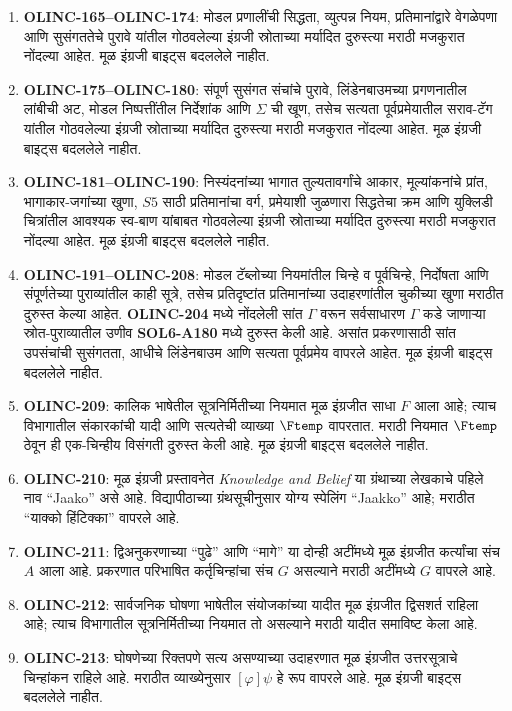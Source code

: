 \begin{enumerate}
\item \textbf{OLINC-165--OLINC-174}: मोडल प्रणालींची
सिद्धता, व्युत्पन्न नियम, प्रतिमानांद्वारे वेगळेपणा
आणि सुसंगततेचे पुरावे यांतील गोठवलेल्या इंग्रजी
स्रोताच्या मर्यादित दुरुस्त्या मराठी मजकुरात नोंदल्या
आहेत. मूळ इंग्रजी बाइट्स बदललेले नाहीत.

\item \textbf{OLINC-175--OLINC-180}: संपूर्ण सुसंगत संचांचे
पुरावे, लिंडेनबाउमच्या प्रगणनातील लांबीची अट,
मोडल निष्पत्तींतील निर्देशांक आणि \(\Sigma\) ची खूण,
तसेच सत्यता पूर्वप्रमेयातील सराव-टॅग यांतील
गोठवलेल्या इंग्रजी स्रोताच्या मर्यादित दुरुस्त्या
मराठी मजकुरात नोंदल्या आहेत. मूळ इंग्रजी बाइट्स
बदललेले नाहीत.

\item \textbf{OLINC-181--OLINC-190}: निस्यंदनांच्या
भागात तुल्यतावर्गांचे आकार, मूल्यांकनांचे प्रांत,
भागाकार-जगांच्या खुणा, \(S5\) साठी प्रतिमानांचा
वर्ग, प्रमेयाशी जुळणारा सिद्धतेचा क्रम आणि
युक्लिडी चित्रांतील आवश्यक स्व-बाण यांबाबत
गोठवलेल्या इंग्रजी स्रोताच्या मर्यादित दुरुस्त्या
मराठी मजकुरात नोंदल्या आहेत. मूळ इंग्रजी बाइट्स
बदललेले नाहीत.

\item \textbf{OLINC-191--OLINC-208}: मोडल टॅब्लोच्या
नियमांतील चिन्हे व पूर्वचिन्हे, निर्दोषता आणि
संपूर्णतेच्या पुराव्यांतील काही सूत्रे, तसेच
प्रतिदृष्टांत प्रतिमानांच्या उदाहरणांतील
चुकीच्या खुणा मराठीत दुरुस्त केल्या आहेत.
\textbf{OLINC-204} मध्ये नोंदलेली सांत
\(\Gamma\) वरून सर्वसाधारण \(\Gamma\) कडे
जाणाऱ्या स्रोत-पुराव्यातील उणीव
\textbf{SOL6-A180} मध्ये दुरुस्त केली आहे.
असांत प्रकरणासाठी सांत उपसंचांची सुसंगतता,
आधीचे लिंडेनबाउम आणि सत्यता पूर्वप्रमेय
वापरले आहेत. मूळ इंग्रजी बाइट्स बदललेले नाहीत.

\item \textbf{OLINC-209}: कालिक भाषेतील सूत्रनिर्मितीच्या
नियमात मूळ इंग्रजीत साधा \(F\) आला आहे; त्याच
विभागातील संकारकांची यादी आणि सत्यतेची व्याख्या
\(\Ftemp\) वापरतात. मराठी नियमात \(\Ftemp\)
ठेवून ही एक-चिन्हीय विसंगती दुरुस्त केली आहे.
मूळ इंग्रजी बाइट्स बदललेले नाहीत.

\item \textbf{OLINC-210}: मूळ इंग्रजी प्रस्तावनेत
\emph{Knowledge and Belief} या ग्रंथाच्या लेखकाचे
पहिले नाव ``Jaako'' असे आहे. विद्यापीठाच्या
ग्रंथसूचीनुसार योग्य स्पेलिंग ``Jaakko'' आहे;
मराठीत ``याक्को हिंटिक्का'' वापरले आहे.
\item \textbf{OLINC-211}: द्विअनुकरणाच्या ``पुढे'' आणि
``मागे'' या दोन्ही अटींमध्ये मूळ इंग्रजीत कर्त्यांचा
संच \(A\) आला आहे. प्रकरणात परिभाषित कर्तृचिन्हांचा
संच \(G\) असल्याने मराठी अटींमध्ये \(G\) वापरले आहे.
\item \textbf{OLINC-212}: सार्वजनिक घोषणा भाषेतील
संयोजकांच्या यादीत मूळ इंग्रजीत द्विसशर्त राहिला
आहे; त्याच विभागातील सूत्रनिर्मितीच्या नियमात तो
असल्याने मराठी यादीत समाविष्ट केला आहे.
\item \textbf{OLINC-213}: घोषणेच्या रिक्तपणे सत्य
असण्याच्या उदाहरणात मूळ इंग्रजीत उत्तरसूत्राचे
चिन्हांकन राहिले आहे. मराठीत व्याख्येनुसार
\([\varphi] \psi\) हे रूप वापरले आहे.
मूळ इंग्रजी बाइट्स बदललेले नाहीत.


\end{enumerate}
